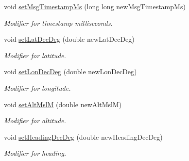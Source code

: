 \begin{DoxyCompactItemize}
void \hyperlink{class_agent_position_a8e650f66dca57e7a512b30014fd5da0c}{setMsgTimestampMs} (long long newMsgTimestampMs)
\begin{DoxyCompactList}\small\item\em Modifier for timestamp milliseconds. \end{DoxyCompactList}\item 
void \hyperlink{class_agent_position_adec8b5202d0e18d8921d90176d8bb5d2}{setLatDecDeg} (double newLatDecDeg)
\begin{DoxyCompactList}\small\item\em Modifier for latitude. \end{DoxyCompactList}\item 
void \hyperlink{class_agent_position_a011104fb914dcadfc77232c5c135c519}{setLonDecDeg} (double newLonDecDeg)
\begin{DoxyCompactList}\small\item\em Modifier for longitude. \end{DoxyCompactList}\item 
void \hyperlink{class_agent_position_a2ef7b229ad422c92580fbad3887180ae}{setAltMslM} (double newAltMslM)
\begin{DoxyCompactList}\small\item\em Modifier for altitude. \end{DoxyCompactList}\item 
void \hyperlink{class_agent_position_ad1bcbd0bdb192593d38e6e8301f60110}{setHeadingDecDeg} (double newHeadingDecDeg)
\begin{DoxyCompactList}\small\item\em Modifier for heading. \end{DoxyCompactList}\end{DoxyCompactItemize}
